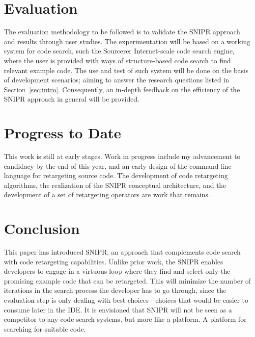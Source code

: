 \documentclass[conference]{IEEEtran}
\begin{document}
\section{Evaluation}
\label{sec:evaluate}

The evaluation methodology to be followed is to validate the \uppercase{SnipR} approach and results through user studies.  The experimentation will be based on a working system for code search, such the Sourcerer\cite{Bajracharya:2006vn} Internet-scale code search engine, where the user is provided with ways of structure-based code search to find relevant example code. The use and test of such system will be done on the basis of development scenarios; aiming to answer the research questions listed in Section~\ref{sec:intro}. Consequently, an in-depth feedback on the efficiency of the \uppercase{SnipR} approach in general will be provided. 

\section{Progress to Date}
\label{sec:progress}
This work is still at early stages. Work in progress include my advancement to candidacy by the end of this year, and an early design of the command line language for retargeting source code. The development of code retargeting algorithms, the realization of the \uppercase{SnipR} conceptual architecture, and the development of a set of retargeting operators are work that remains.

\section{Conclusion}
\label{sec:conclude}
This paper has introduced \uppercase{SnipR}, an approach that complements code search with code retargeting capabilities. Unlike prior work, the \uppercase{SnipR} enables developers to engage in a virtuous loop where they find and select only the promising example code that can be retargeted. This will minimize the number of iterations in the search process the developer has to go through, since the evaluation step is only dealing with best choices---choices that would be easier to consume later in the IDE. It is envisioned that \uppercase{SnipR} will not be seen as a competitor to any code search systems, but more like a platform. A platform for searching for suitable code.




%
	
\end{document}
